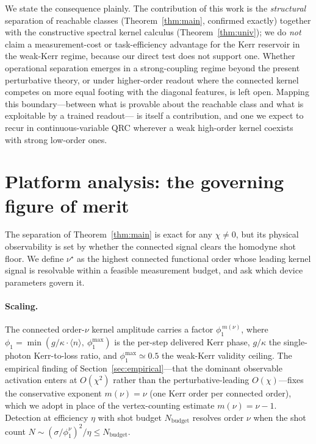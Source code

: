 \documentclass[11pt]{article}
\theoremstyle{remark}
\newcommand{\nustar}{\nu^{\star}}
\begin{document}
We state the consequence plainly. The contribution of this work is the
\emph{structural} separation of reachable classes (Theorem~\ref{thm:main},
confirmed exactly) together with the constructive spectral kernel calculus
(Theorem~\ref{thm:univ}); we do \emph{not} claim a measurement-cost or
task-efficiency advantage for the Kerr reservoir in the weak-Kerr regime, because
our direct test does not support one. Whether operational separation emerges in a
strong-coupling regime beyond the present perturbative theory, or under
higher-order readout where the connected kernel competes on more equal footing
with the diagonal features, is left open. Mapping this boundary---between what is
provable about the reachable class and what is exploitable by a trained readout---
is itself a contribution, and one we expect to recur in continuous-variable QRC
wherever a weak high-order kernel coexists with strong low-order ones.

\section{Platform analysis: the governing figure of merit}
\label{sec:platform}

The separation of Theorem~\ref{thm:main} is exact for any $\chi\neq0$, but its
physical observability is set by whether the connected signal clears the homodyne
shot floor. We define $\nustar$ as the highest connected functional order whose
leading kernel signal is resolvable within a feasible measurement budget, and ask
which device parameters govern it.

\paragraph{Scaling.}
The connected order-$\nu$ kernel amplitude carries a factor $\phi_1^{\,m(\nu)}$,
where $\phi_1=\min(g/\kappa\cdot\langle n\rangle,\ \phi_1^{\max})$ is the per-step
delivered Kerr phase, $g/\kappa$ the single-photon Kerr-to-loss ratio, and
$\phi_1^{\max}\simeq0.5$ the weak-Kerr validity ceiling. The empirical finding of
Section~\ref{sec:empirical}---that the dominant observable activation enters at
$O(\chi^2)$ rather than the perturbative-leading $O(\chi)$---fixes the
conservative exponent $m(\nu)=\nu$ (one Kerr order per connected order), which we
adopt in place of the vertex-counting estimate $m(\nu)=\nu-1$. Detection at
efficiency $\eta$ with shot budget $N_{\mathrm{budget}}$ resolves order $\nu$ when
the shot count $N\sim(\sigma/\phi_1^{\nu})^2/\eta\le N_{\mathrm{budget}}$.
\end{document}
